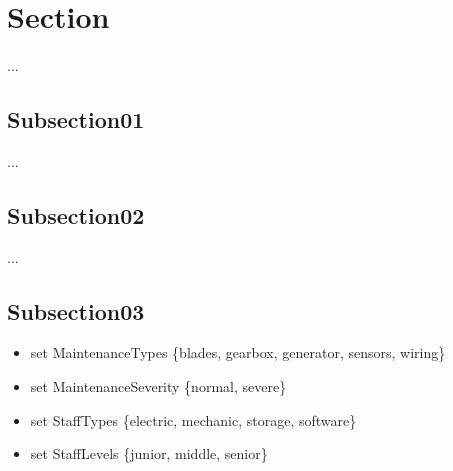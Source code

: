 \section{Section}
  \paragraph{}
    ...

    \subsection{Subsection01}
      ...

    \subsection{Subsection02}
      ...

    \subsection{Subsection03}
      \begin{itemize}
        \item set MaintenanceTypes \{blades, gearbox, generator, sensors, wiring\}
        \item set MaintenanceSeverity \{normal, severe\}
        \item set StaffTypes \{electric, mechanic, storage, software\}
        \item set StaffLevels \{junior, middle, senior\}
      \end{itemize}
